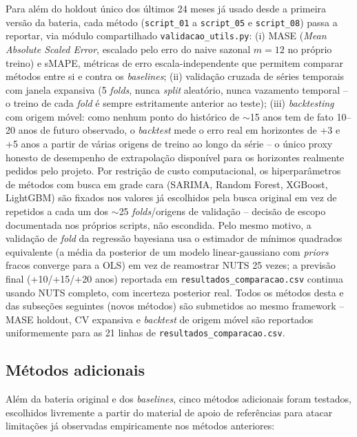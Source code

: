 Para além do holdout único dos últimos 24 meses já usado desde a primeira versão da bateria, cada método (\texttt{script\_01} a \texttt{script\_05} e \texttt{script\_08}) passa a reportar, via módulo compartilhado \texttt{validacao\_utils.py}: (i) MASE (\textit{Mean Absolute Scaled Error}, escalado pelo erro do naive sazonal $m=12$ no próprio treino) e sMAPE, métricas de erro escala-independente que permitem comparar métodos entre si e contra os \textit{baselines}; (ii) validação cruzada de séries temporais com janela expansiva (5 \textit{folds}, nunca \textit{split} aleatório, nunca vazamento temporal -- o treino de cada \textit{fold} é sempre estritamente anterior ao teste); (iii) \textit{backtesting} com origem móvel: como nenhum ponto do histórico de $\sim$15 anos tem de fato 10--20 anos de futuro observado, o \textit{backtest} mede o erro real em horizontes de +3 e +5 anos a partir de várias origens de treino ao longo da série -- o único proxy honesto de desempenho de extrapolação disponível para os horizontes realmente pedidos pelo projeto. Por restrição de custo computacional, os hiperparâmetros de métodos com busca em grade cara (SARIMA, Random Forest, XGBoost, LightGBM) são fixados nos valores já escolhidos pela busca original em vez de repetidos a cada um dos $\sim$25 \textit{folds}/origens de validação -- decisão de escopo documentada nos próprios scripts, não escondida. Pelo mesmo motivo, a validação de \textit{fold} da regressão bayesiana usa o estimador de mínimos quadrados equivalente (a média da posterior de um modelo linear-gaussiano com \textit{priors} fracos converge para a OLS) em vez de reamostrar NUTS 25 vezes; a previsão final (+10/+15/+20 anos) reportada em \texttt{resultados\_comparacao.csv} continua usando NUTS completo, com incerteza posterior real. Todos os métodos desta e das subseções seguintes (novos métodos) são submetidos ao mesmo framework -- MASE holdout, CV expansiva e \textit{backtest} de origem móvel são reportados uniformemente para as 21 linhas de \texttt{resultados\_comparacao.csv}.

\subsection{Métodos adicionais}

Além da bateria original e dos \textit{baselines}, cinco métodos adicionais foram testados, escolhidos livremente a partir do material de apoio de referências para atacar limitações já observadas empiricamente nos métodos anteriores:

